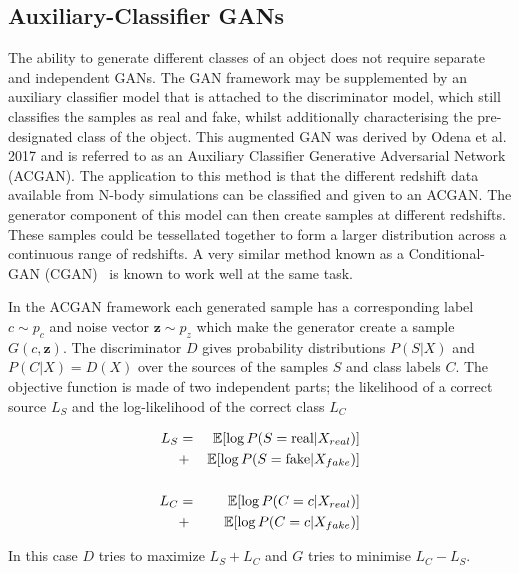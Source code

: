 \documentclass[twocolumn]{article}
\newcommand\EE{\mathbb{E}}
\numberwithin{equation}{section}
\begin{document}
\subsection{Auxiliary-Classifier GANs}
The ability to generate different classes of an object does not require separate and independent GANs. The GAN framework 
may be supplemented by an auxiliary classifier model that is attached to the discriminator model, which still classifies 
the samples as real and fake, whilst additionally characterising the pre-designated class of the object. This augmented 
GAN was derived by Odena et al. 2017 \cite{acgan} and is referred to as an Auxiliary Classifier Generative Adversarial 
Network (ACGAN). The application to this method is that the different redshift data available from N-body simulations can 
be classified and given to an ACGAN. The generator component of this model can then create samples at different redshifts. 
These samples could be tessellated together to form a larger distribution across a continuous range of  redshifts. A very 
similar method known as a Conditional-GAN (CGAN)~\cite{cgan} is known to work well at the same task.

In the ACGAN framework each generated sample has a corresponding label $c \sim p_c$ and noise vector $\mathbf{z} \sim p_z$ 
which make the generator create a sample $G(c, \mathbf{z})$. The discriminator $D$ gives probability distributions $P(S|X)$ 
and $P(C|X) = D(X)$ over the sources of the samples $S$ and class labels $C$. The objective function is made of two 
independent parts; the likelihood of a correct source $L_S$ and the log-likelihood of the correct class $L_C$

\begin{eqnarray}
    L_S &=& \EE [\log P(S = \textup{real} | X_{real})] \nonumber \\
        &+& \EE [\log P(S = \textup{fake} | X_{fake})] \\ 
        & & \nonumber \\ 
    L_C &=& \EE [\log P(C = c | X_{real})] \nonumber \\
        &+& \EE [\log P(C = c | X_{fake})]
\end{eqnarray}

In this case $D$ tries to maximize $L_S + L_C$ and $G$ tries to minimise $L_C - L_S$.

\end{document}
